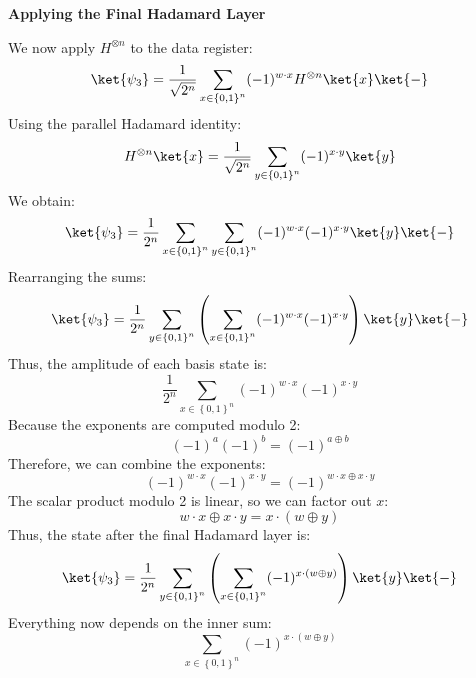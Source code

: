 \highspace
\begin{flushleft}
    \textcolor{Green3}{ \textbf{Applying the Final Hadamard Layer}}
\end{flushleft}
We now apply $H^{\otimes n}$ to the data register:
\begin{equation*}
    \ket{\psi_3} = \frac{1}{\sqrt{2^n}} \sum_{x \in \left\{0,1\right\}^n} (-1)^{w \cdot x} H^{\otimes n} \ket{x} \ket{-}
\end{equation*}
Using the parallel Hadamard identity:
\begin{equation*}
    H^{\otimes n} \ket{x} = \frac{1}{\sqrt{2^n}} \sum_{y \in \left\{0,1\right\}^n} (-1)^{x \cdot y} \ket{y}
\end{equation*}
We obtain:
\begin{equation*}
    \ket{\psi_3} = \frac{1}{2^n} \sum_{x \in \left\{0,1\right\}^n} \sum_{y \in \left\{0,1\right\}^n} (-1)^{w \cdot x} (-1)^{x \cdot y} \ket{y} \ket{-}
\end{equation*}
Rearranging the sums:
\begin{equation*}
    \ket{\psi_3} = \frac{1}{2^n} \sum_{y \in \left\{0,1\right\}^n} \left( \sum_{x \in \left\{0,1\right\}^n} (-1)^{w \cdot x} (-1)^{x \cdot y} \right) \ket{y} \ket{-}
\end{equation*}
Thus, the amplitude of each basis state  is:
\begin{equation*}
    \frac{1}{2^n} \sum_{x \in \left\{0,1\right\}^n} (-1)^{w \cdot x} (-1)^{x \cdot y}
\end{equation*}
Because the exponents are computed modulo 2:
\begin{equation*}
    \left(-1\right)^{a} \left(-1\right)^{b} = \left(-1\right)^{a \oplus b}
\end{equation*}
Therefore, we can combine the exponents:
\begin{equation*}
    \left(-1\right)^{w \cdot x} \left(-1\right)^{x \cdot y} = \left(-1\right)^{w \cdot x \oplus x \cdot y}
\end{equation*}
The scalar product modulo 2 is linear, so we can factor out $x$:
\begin{equation*}
    w \cdot x \oplus x \cdot y = x \cdot (w \oplus y)
\end{equation*}
Thus, the state after the final Hadamard layer is:
\begin{equation}
    \ket{\psi_3} = \frac{1}{2^n} \sum_{y \in \left\{0,1\right\}^n} \left( \sum_{x \in \left\{0,1\right\}^n} (-1)^{x \cdot (w \oplus y)} \right) \ket{y} \ket{-}
\end{equation}
Everything now depends on the inner sum:
\begin{equation*}
    \sum_{x \in \left\{0,1\right\}^n} (-1)^{x \cdot (w \oplus y)}
\end{equation*}

